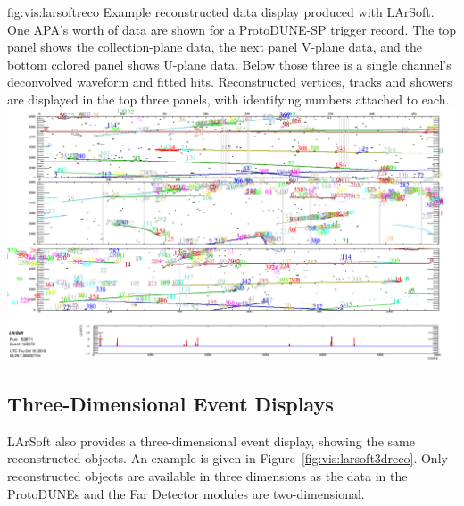 \documentclass[../main-v1.tex]{subfiles}
\begin{document}
\begin{dunefigure}
{fig:vis:larsoftreco} 
{Example reconstructed data display produced with LArSoft.  One APA's worth of data are shown for a ProtoDUNE-SP trigger record. The top panel shows the collection-plane data, the next panel V-plane data, and the bottom colored panel shows U-plane data.  Below those three is a single channel's deconvolved waveform and fitted hits.  Reconstructed vertices, tracks and showers are displayed in the top three panels, with identifying numbers attached to each.}
\includegraphics[width=0.9 \textwidth]{graphics/EventDisplays/larsoft_reco_example_evd.png}
\end{dunefigure}


\subsection{Three-Dimensional Event Displays}
\label{sec:visualization:3d}

 LArSoft also provides a three-dimensional event display, showing the same reconstructed objects.  An example is given in Figure~\ref{fig:vis:larsoft3dreco}.  Only reconstructed objects are available in three dimensions as the data in the ProtoDUNEs and the Far Detector modules are two-dimensional.
 
\end{document}
